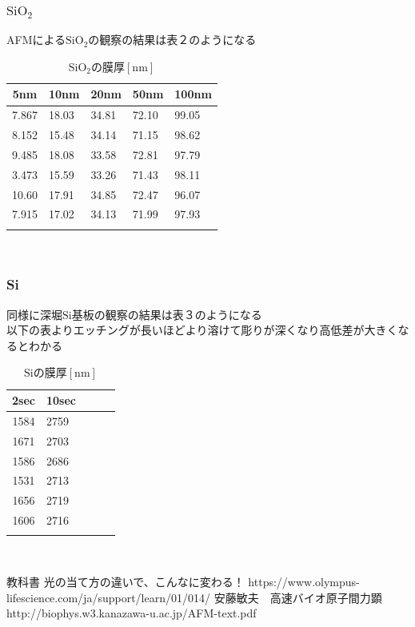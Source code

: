 \documentclass{jsarticle}
\begin{document}
\subsubsection{$\mathrm{SiO_2}$}
AFMによる$\mathrm{SiO_2}$の観察の結果は表２のようになる\\
\begin{table}[h]
\caption{$\mathrm{SiO_2}の膜厚[\mathrm{nm}]$}
 \label{table:SpeedOfLight}
 \centering
  \begin{tabular}{cllll}
   \hline
   5nm & 10nm & 20nm & 50nm & 100nm\\
   \hline \hline
   7.867 & 18.03 & 34.81 & 72.10 & 99.05\\
   8.152 & 15.48 & 34.14 & 71.15 & 98.62\\
   9.485 & 18.08 & 33.58 & 72.81 & 97.79\\
   3.473 & 15.59 & 33.26 & 71.43 & 98.11\\
   10.60 & 17.91 & 34.85 & 72.47 & 96.07\\
   \hline
   7.915 & 17.02 & 34.13 & 71.99 & 97.93\\
   \\
  \end{tabular}
\end{table}
\\
\subsubsection{Si}
同様に深堀$\mathrm{Si}基板の$観察の結果は表３のようになる\\
以下の表よりエッチングが長いほどより溶けて彫りが深くなり高低差が大きくなるとわかる\\
\begin{table}[h]
\caption{$\mathrm{Si}の膜厚[\mathrm{nm}]$}
 \label{table:SpeedOfLight}
 \centering
  \begin{tabular}{cllll}
   \hline
   2sec & 10sec\\
   \hline \hline
   1584 & 2759\\
   1671 & 2703\\
   1586 & 2686\\
   1531 & 2713\\
   1656 & 2719\\
   \hline
   1606 & 2716\\
   \\
  \end{tabular}
\end{table}
\\
\begin{thebibliography}{99}
\bibitem{} 教科書
\bibitem{} 光の当て方の違いで、こんなに変わる！  https://www.olympus-lifescience.com/ja/support/learn/01/014/
\bibitem{} 安藤敏夫　高速バイオ原子間力顕 http://biophys.w3.kanazawa-u.ac.jp/AFM-text.pdf
\end{thebibliography} 
\end{document}
